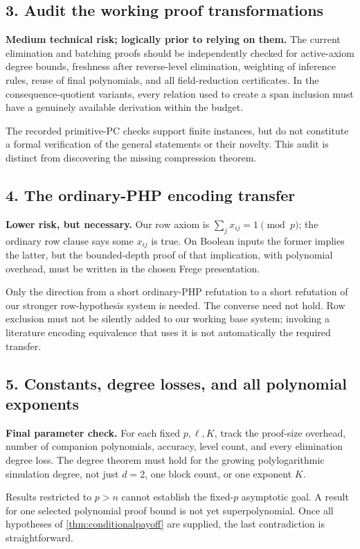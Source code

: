 \subsection*{3. Audit the working proof transformations}
\textbf{Medium technical risk; logically prior to relying on them.} The current elimination and batching proofs should be independently checked for active-axiom degree bounds, freshness after reverse-level elimination, weighting of inference rules, reuse of final polynomials, and all field-reduction certificates. In the consequence-quotient variants, every relation used to create a span inclusion must have a genuinely available derivation within the budget.

The recorded primitive-PC checks support finite instances, but do not constitute a formal verification of the general statements or their novelty. This audit is distinct from discovering the missing compression theorem.

\subsection*{4. The ordinary-PHP encoding transfer}
\textbf{Lower risk, but necessary.} Our row axiom is $\sum_jx_{ij}=1\pmod p$; the ordinary row clause says some $x_{ij}$ is true. On Boolean inputs the former implies the latter, but the bounded-depth proof of that implication, with polynomial overhead, must be written in the chosen Frege presentation.

Only the direction from a short ordinary-PHP refutation to a short refutation of our stronger row-hypothesis system is needed. The converse need not hold. Row exclusion must not be silently added to our working base system; invoking a literature encoding equivalence that uses it is not automatically the required transfer.

\subsection*{5. Constants, degree losses, and all polynomial exponents}
\textbf{Final parameter check.} For each fixed $p,\ell,K$, track the proof-size overhead, number of companion polynomials, accuracy, level count, and every elimination degree loss. The degree theorem must hold for the growing polylogarithmic simulation degree, not just $d=2$, one block count, or one exponent $K$.

Results restricted to $p>n$ cannot establish the fixed-$p$ asymptotic goal. A result for one selected polynomial proof bound is not yet superpolynomial. Once all hypotheses of \cref{thm:conditionalpayoff} are supplied, the last contradiction is straightforward.

